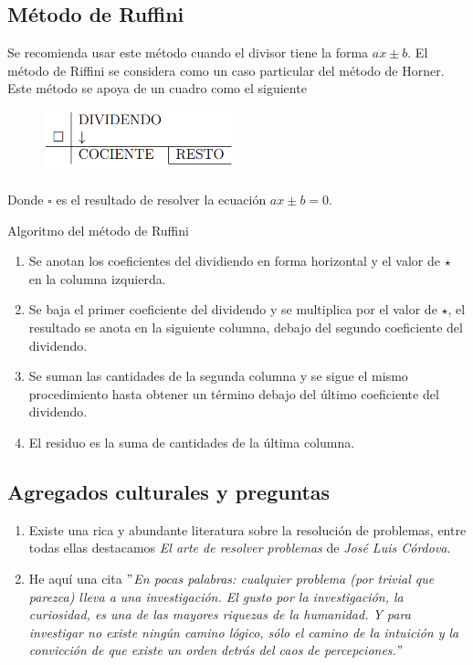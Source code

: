 \subsection{Método de Ruffini}

Se recomienda usar este método cuando el divisor tiene la forma $ax \pm b$.
El método de Riffini se considera como un caso particular del método de Horner.
Este método se apoya de un cuadro como el siguiente
\begin{figure}[htb]
    \centering
    \includegraphics[width=5.5cm]{images/metodo-de-ruffini}
\end{figure}

Donde $\square$ es el resultado de resolver la ecuación $ax \pm b = 0$.

Algoritmo del método de Ruffini
\begin{enumerate}
    \item Se anotan los coeficientes del dividiendo en forma horizontal y el valor de $\star$ en la columna izquierda.
    \item Se baja el primer coeficiente del dividendo y se multiplica por el valor de $\star$, el resultado se anota en la siguiente columna,
    debajo del segundo coeficiente del dividendo.
    \item Se suman las cantidades de la segunda columna y se sigue el mismo procedimiento hasta obtener un término debajo del último coeficiente del dividendo.
    \item El residuo es la suma de cantidades de la última columna.
\end{enumerate}



\subsection{Agregados culturales y preguntas}

\begin{enumerate}
    \item Existe una rica y abundante literatura sobre la resolución de problemas, entre todas ellas destacamos \textit{El arte de resolver problemas} de \textit{José Luis Córdova}.
    \item He aquí una cita \textit{\("\)En pocas palabras: cualquier problema (por trivial que parezca) lleva a una investigación.
    El gusto por la investigación, la curiosidad, es una de las mayores riquezas de la humanidad.
    Y para investigar no existe ningún camino lógico, sólo el camino de la intuición y la convicción de que existe un orden detrás del caos de percepciones.\("\)}
\end{enumerate}



